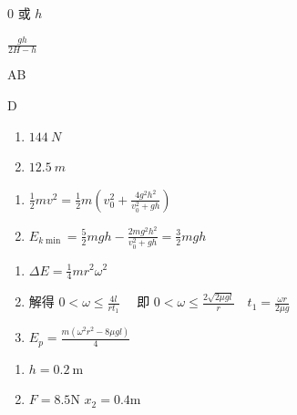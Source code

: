 \item $ 0 $ 或 $h$
\item $\frac {g h}{2 H-h}$
\item AB
\item D
\item \begin {enumerate} \renewcommand {\labelenumi }{\arabic {enumi}.} \item $ 144 \ N $ \par \item $ 12.5 \ m $ \par \par \par \end {enumerate} \par \par 
\item \begin {enumerate} \renewcommand {\labelenumi }{\arabic {enumi}.} \item $\frac {1}{2} m v^{2}=\frac {1}{2} m\left (v_{0}^{2}+\frac {4 g^{2} h^{2}}{v_{0}^{2}+g h}\right )$ \par \item $E_{k \min }=\frac {5}{2} m g h-\frac {2 m g^{2} h^{2}}{v_{0}^{2}+g h}=\frac {3}{2} m g h$ \par \par \end {enumerate} \par \par 
\item \begin {enumerate} \renewcommand {\labelenumi }{\arabic {enumi}.} \item $\Delta E=\frac {1}{4} m r^{2} \omega ^{2}$ \par \item 解得 $0<\omega \leq \frac {4 l}{r t_{1}} \quad $ 即 $0<\omega \leq \frac {2 \sqrt {2 \mu g l}}{r} \quad t_{1}=\frac {\omega r}{2 \mu g}$ \item $E_{p}=\frac {m\left (\omega ^{2} r^{2}-8 \mu g l\right )}{4}$ \end {enumerate} \par \par 
\item \begin {enumerate} \renewcommand {\labelenumi }{\arabic {enumi}.} \item $h=0.2 \ \mathrm {m}$ \par \item $F=8.5 \mathrm {N}$ \qquad $x_{2}=0.4 \mathrm {m}$ \par \end {enumerate} \par \par 
